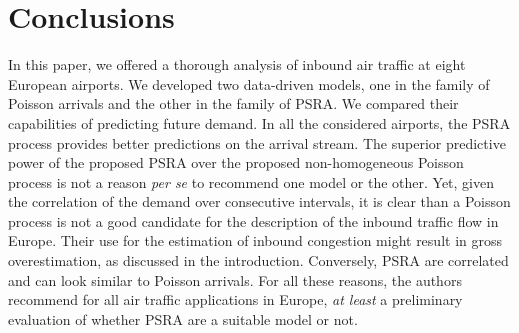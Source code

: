 \documentclass[draft,review]{elsarticle}
\begin{document}
\section{Conclusions}\label{sec:conclusions}






  In this paper, we offered a thorough analysis of inbound air traffic at eight European airports. We developed two data-driven models, one in the family of Poisson arrivals and the other in the family of \ac{PSRA}.
  We compared their capabilities of predicting future demand.
  In all the considered airports, the \ac{PSRA} process provides better predictions on the arrival stream.
  The superior predictive power of the proposed \ac{PSRA} over the proposed non-homogeneous Poisson process is not a reason \emph{per se} to recommend one model or the other.
  Yet, given the correlation of the demand over consecutive intervals, it is clear than a Poisson process is not a good candidate for the description of the inbound traffic flow in Europe. Their use for the estimation of inbound congestion might result in gross overestimation, as discussed in the introduction. Conversely, \ac{PSRA} are correlated and can look similar to Poisson arrivals. For all these reasons, the authors recommend for all air traffic applications in Europe, \emph{at least} a preliminary evaluation of whether \ac{PSRA} are a suitable model or not.
\end{document}
